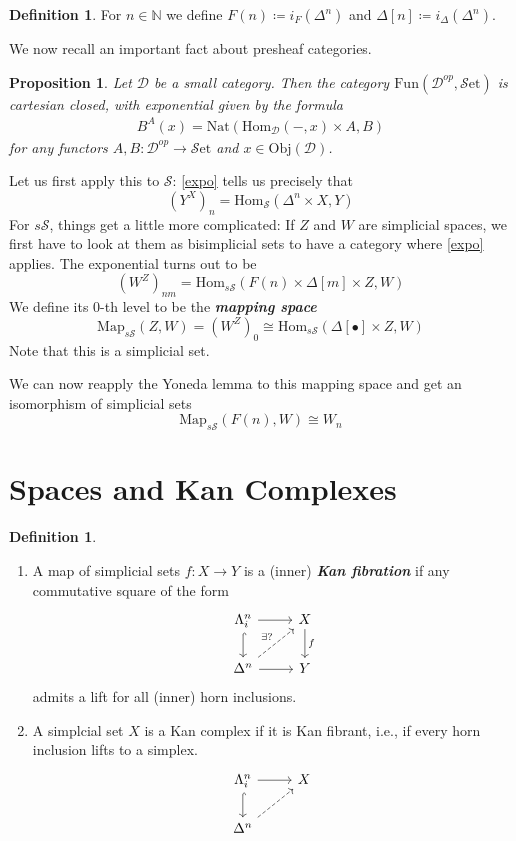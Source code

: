 \documentclass{article}
\newcommand{\textbi}[1]{\textbf{\textit{#1}}}
\newcommand{\D}{\mathscr{D}}
\newcommand{\bN}{\mathbb{N}}
\newcommand{\cS}{\mathcal{S}}
\newcommand{\Obj}{\mathrm{Obj}}
\newcommand{\Hom}{\mathrm{Hom}}
\newcommand{\Set}{\cS\mathrm{et}}
\newcommand{\sS}{s\cS}
\newcommand{\Fun}{\mathrm{Fun}}
\newcommand{\Map}{\mathrm{Map}}
\newcommand{\Nat}{\mathrm{Nat}}
\newtheorem{prop}[subsection]{Proposition}
\theoremstyle{definition}
\newtheorem{defin}[subsection]{Definition}
\begin{document}
\begin{defin}
    For $n\in\bN$ we define $F(n)\coloneqq i_F(\Delta^n)$ and $\Delta[n]\coloneqq  i_\Delta(\Delta^n)$.
\end{defin}

We now recall an important fact about presheaf categories.
\begin{prop}
    Let $\D$ be a small category. Then the category $\Fun(\D^{op}, \Set)$ is cartesian closed, with exponential given by the formula \begin{align}\label{expo}
        B^A(x)=\Nat(\Hom_{\D}(-,x)\times A, B)
    \end{align} for any functors $A,B:\D^{op}\to \Set$ and $x\in\Obj(\D)$.
\end{prop}

Let us first apply this to $\cS$: \ref{expo} tells us precisely that $$(Y^X)_n=\Hom_{\cS}(\Delta^n\times X, Y)$$
For $\sS$, things get a little more complicated: If $Z$ and $W$ are simplicial spaces, we first have to look at them as bisimplicial sets to have a category where \ref{expo} applies. The exponential turns out to be $$(W^Z)_{nm}=\Hom_{\sS}(F(n)\times\Delta[m]\times Z, W)$$
We define its $0$-th level to be the \textbi{mapping space} $$\Map_{\sS}(Z,W)=(W^Z)_0\cong \Hom_{\sS}(\Delta[\bullet]\times Z, W)$$ Note that this is a simplicial set.
\par We can now reapply the Yoneda lemma to this mapping space and get an isomorphism of simplicial sets $$\Map_{\sS}(F(n),W)\cong W_n$$

\section{Spaces and Kan Complexes}

\begin{defin}
    \begin{enumerate}
        \item A map of simplicial sets $f:X\to Y$ is a (inner) \textbi{Kan fibration} if any commutative square of the form 
        \[\begin{tikzcd}
            \Lambda^n_i \arrow[r] \arrow[d, hook] & X \arrow[d, "f"] \\
            \Delta^n \arrow[ru, dashed, "\exists ?"] \arrow[r] & Y
        \end{tikzcd}\]
        admits a lift for all (inner) horn inclusions.
        \item A simplcial set $X$ is a Kan complex if it is Kan fibrant, i.e., if every horn inclusion lifts to a simplex.
        \[\begin{tikzcd}
            \Lambda^n_i \arrow[r] \arrow[d, hook] & X \\
            \Delta^n \arrow[ur, dashed]
        \end{tikzcd}\]
    \end{enumerate}   
\end{defin}
\end{document}
